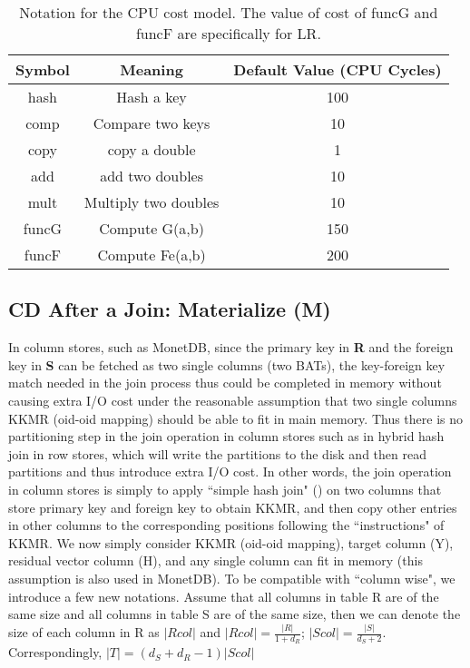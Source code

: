 \documentclass{vldb}
\begin{document}
\begin{table}[t]
\tiny
\centering
\label{cost model}
\begin{tabular}{|c|c|c|}
\hline
{\bf Symbol} & Meaning              & {\bf Default Value (CPU Cycles)} \\ \hline
hash         & Hash a key           & 100                              \\ \hline
comp         & Compare two keys     & 10                               \\ \hline
copy         & copy a double        & 1                                \\ \hline
add          & add two doubles      & 10                               \\ \hline
mult         & Multiply two doubles & 10                               \\ \hline
funcG        & Compute G(a,b)       & 150                              \\ \hline
funcF        & Compute Fe(a,b)      & 200                              \\ \hline
\end{tabular}
\caption{Notation for the CPU cost model. The value of cost of funcG and funcF are specifically for LR.}
\label{tab:symbol&meaning}
\end{table}

\subsection{CD After a Join: Materialize (M)}
In column stores, such as MonetDB, since the primary key in  \textbf{R} and the foreign key in \textbf{S} can be fetched as two single columns (two BATs), the 
key-foreign key match needed in the join process thus could be completed in memory without causing extra I/O cost under the reasonable assumption
that two single columns KKMR (oid-oid mapping) should be able to fit in main memory. Thus there is no partitioning step in the join operation in column stores  
such as in hybrid hash join in row stores, which will write the partitions to the disk and then read partitions and thus introduce extra I/O cost. In other words, the join operation in column stores is simply to apply ``simple hash join" (\cite{Shapiro}) on two columns that store primary key and foreign key to obtain KKMR, and then copy other entries in other columns to the corresponding positions following the ``instructions" of KKMR. We now simply consider KKMR (oid-oid mapping), target column (Y), residual vector column (H),  and any single column can fit in memory (this assumption is also used in MonetDB).  To be compatible with ``column wise", we introduce
a few new notations. Assume that all columns in table R are of the same size and all columns in table S are of the same size, then we can denote the size of each column in R as $|Rcol|$ and $|Rcol| = \frac{|R|}{1+d_R}$; $|Scol| = \frac{|S|}{d_S+2}$.
Correspondingly, $|T| = (d_S+d_R-1)|Scol|$  
\end{document}
